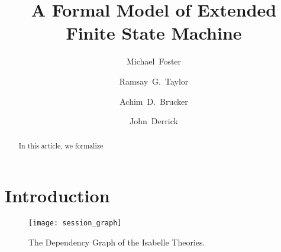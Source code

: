 \documentclass[10pt,DIV14,a4paper,twoside=semi,openright]
{scrartcl}
\title{A Formal Model of Extended Finite State Machine}%
\author{Michael~Foster\orcidID{0000-0001-8233-9873} \and
 Ramsay~G.~Taylor\orcidID{0000-0002-4036-7590} \and
 Achim~D.~Brucker\orcidID{0000-0002-6355-1200} \and
 John~Derrick\orcidID{0000-0002-6631-8914}}
\begin{document}
\begin{titlepage}
  \maketitle
  \thispagestyle{empty}
  \begin{abstract}
    In this article, we formalize


    \bigskip
  \end{abstract}
\end{titlepage}
\cleardoublepage

\tableofcontents
\cleardoublepage

\section{Introduction}
\cite{foster.ea:efsm:2018}
\begin{figure}
  \centering
  \texttt{[image: session\_graph]}
  \caption{The Dependency Graph of the Isabelle Theories.\label{fig:session-graph}}
\end{figure}

\clearpage



{\small
  
  
}
\end{document}
